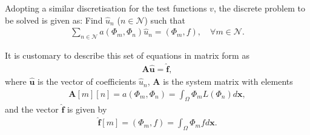 Adopting a similar discretisation for the test functions $v$, the
discrete problem to be solved is given as: Find $\hat{u}_n$
($n\in\mathcal{N}$) such that
\begin{align*}
\sum_{n\in\mathcal{N}}a(\Phi_m,\Phi_n)\hat{u}_n=(\Phi_m,f),\quad \forall
m\in\mathcal{N}.
\end{align*}

It is customary to describe this set of equations in matrix form as
\begin{align*}
\boldsymbol{A}\hat{\boldsymbol{u}}=\hat{\boldsymbol{f}},
\end{align*}
where $\hat{\boldsymbol{u}}$ is the vector of coefficients $\hat{u}_n$,
$\boldsymbol{A}$ is the system matrix with elements
\begin{align*}
\boldsymbol{A}[m][n]=a(\Phi_m,\Phi_n)=\int_\Omega \Phi_mL(\Phi_n)d\boldsymbol{x},
\end{align*}
and the vector $\hat{\boldsymbol{f}}$ is given by
\begin{align*}
\hat{\boldsymbol{f}}[m]=(\Phi_m,f)=\int_\Omega \Phi_mfd\boldsymbol{x}.
\end{align*}
